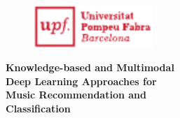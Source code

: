 
\newpage
\thispagestyle{empty}
\begin{titlingpage}
\begin{flushright}

  \begin{figure}[t]
    \begin{flushright}
      \includegraphics[width=4.5cm]{ch00_pics/upf-logo-bo}
    \end{flushright}
  \end{figure}

  \vspace*{2.2cm} 


  {\huge \textbf{Knowledge-based and Multimodal  \\ \vspace*{0.05cm} Deep Learning Approaches for \\ \vspace*{0.10cm} Music Recommendation and \\ \vspace*{0.40cm} Classification}}


\end{flushright}
\end{titlingpage}
